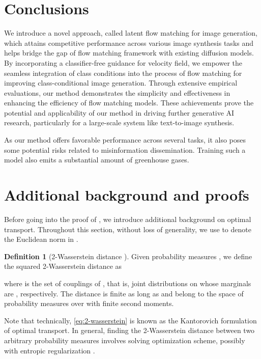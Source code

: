 \documentclass{article}
\newcommand{\minisection}[1]{\vspace{2mm}\noindent{\textbf{#1}}}
\theoremstyle{plain}
\theoremstyle{definition}
\newtheorem{definition}[theorem]{Definition}
\theoremstyle{remark}
\begin{document}
\section{Conclusions}
We introduce a novel approach, called latent flow matching for image generation, which attains competitive performance across various image synthesis tasks and helps bridge the gap of flow matching framework with existing diffusion models. By incorporating a classifier-free guidance for velocity field, we empower the seamless integration of class conditions into the process of flow matching for improving class-conditional image generation. Through extensive empirical evaluations, our method demonstrates the simplicity and effectiveness in enhancing the efficiency of flow matching models. These achievements prove the potential and applicability of our method in driving further generative AI research, particularly for a large-scale system like text-to-image synthesis.

\minisection{Limitation and societal impact.} As our method offers favorable performance across several tasks, it also poses some potential risks related to misinformation dissemination. Training such a model also emits a substantial amount of greenhouse gases.




\newpage
\appendix
\section{Additional background and proofs}
\label{sec:appendix-proof}

Before going into the proof of , we introduce additional background on optimal transport.
Throughout this section, without loss of generality, we use  to denote the Euclidean norm in .



\begin{definition}[2-Wasserstein distance \cite{villani2009optimal}]
  \label{def:2wass}
  Given probability measures , we define the squared 2-Wasserstein distance as

where  is the set of couplings of , that is, joint distributions on  whose marginals are , respectively.
The distance is finite as long as  and  belong to the space  of probability measures over  with finite second moments.
\end{definition}
Note that technically, \eqref{eq:2-wasserstein} is known as the Kantorovich formulation of optimal transport.
In general, finding the 2-Wasserstein distance between two arbitrary probability measures involves solving optimization scheme, possibly with entropic regularization \cite{peyre2019computational}.
\end{document}
